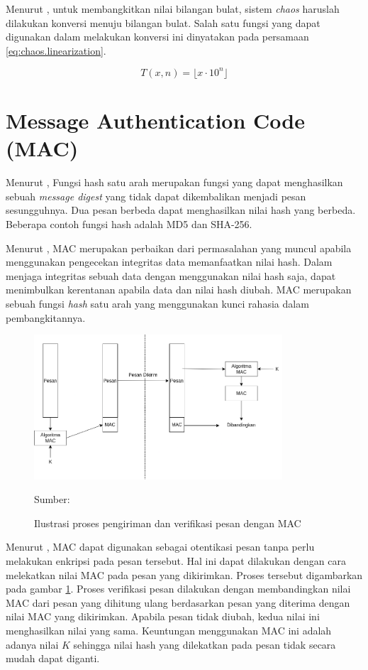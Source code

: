 Menurut \textcite{munir2019}, untuk membangkitkan nilai bilangan bulat, sistem \emph{chaos} haruslah dilakukan konversi menuju bilangan bulat. Salah satu fungsi yang dapat digunakan dalam melakukan konversi ini dinyatakan pada persamaan \ref{eq:chaos.linearization}.

\begin{equation}
  \label{eq:chaos.linearization}
  T(x, n) = \lfloor x \cdot 10^n \rfloor
\end{equation}

\section{Message Authentication Code (MAC)}
Menurut \textcite{munir2019}, Fungsi hash satu arah merupakan fungsi yang dapat menghasilkan sebuah \emph{message digest} yang tidak dapat dikembalikan menjadi pesan sesungguhnya. Dua pesan berbeda dapat menghasilkan nilai hash yang berbeda. Beberapa contoh fungsi hash adalah MD5 dan SHA-256.

Menurut \textcite{munir2019}, MAC merupakan perbaikan dari permasalahan yang muncul apabila menggunakan pengecekan integritas data memanfaatkan nilai hash. Dalam menjaga integritas sebuah data dengan menggunakan nilai hash saja, dapat menimbulkan kerentanan apabila data dan nilai hash diubah. MAC merupakan sebuah fungsi \emph{hash} satu arah yang menggunakan kunci rahasia dalam pembangkitannya.

\begin{figure}[!h]
  \centering
  \includegraphics[width=350px]{chapters/res/chapter-2/img/mac.png}
  \caption{Ilustrasi proses pengiriman dan verifikasi pesan dengan MAC} \label{fig:mac}
  Sumber: \textcite{munir2019}
\end{figure}

Menurut \textcite{munir2019}, MAC dapat digunakan sebagai otentikasi pesan tanpa perlu melakukan enkripsi pada pesan tersebut. Hal ini dapat dilakukan dengan cara melekatkan nilai MAC pada pesan yang dikirimkan. Proses tersebut digambarkan pada gambar \ref{fig:mac}. Proses verifikasi pesan dilakukan dengan membandingkan nilai MAC dari pesan yang dihitung ulang berdasarkan pesan yang diterima dengan nilai MAC yang dikirimkan. Apabila pesan tidak diubah, kedua nilai ini menghasilkan nilai yang sama. Keuntungan menggunakan MAC ini adalah adanya nilai $K$ sehingga nilai hash yang dilekatkan pada pesan tidak secara mudah dapat diganti.

